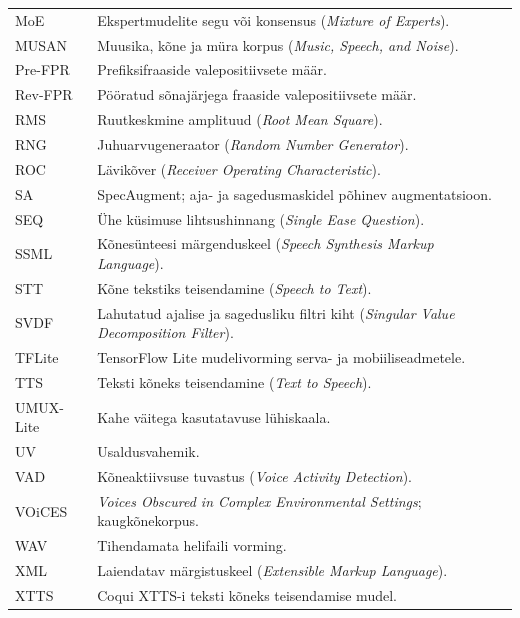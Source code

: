 \begin{longtable}{p{3.2cm}p{9.8cm}}
MoE & Ekspertmudelite segu või konsensus (\textit{Mixture of Experts}).\\
MUSAN & Muusika, kõne ja müra korpus (\textit{Music, Speech, and Noise}).\\
Pre-FPR & Prefiksifraaside valepositiivsete määr.\\
Rev-FPR & Pööratud sõnajärjega fraaside valepositiivsete määr.\\
RMS & Ruutkeskmine amplituud (\textit{Root Mean Square}).\\
RNG & Juhuarvugeneraator (\textit{Random Number Generator}).\\
ROC & Lävikõver (\textit{Receiver Operating Characteristic}).\\
SA & SpecAugment; aja- ja sagedusmaskidel põhinev augmentatsioon.\\
SEQ & Ühe küsimuse lihtsushinnang (\textit{Single Ease Question}).\\
SSML & Kõnesünteesi märgenduskeel (\textit{Speech Synthesis Markup Language}).\\
STT & Kõne tekstiks teisendamine (\textit{Speech to Text}).\\
SVDF & Lahutatud ajalise ja sagedusliku filtri kiht (\textit{Singular Value Decomposition Filter}).\\
TFLite & TensorFlow Lite mudelivorming serva- ja mobiiliseadmetele.\\
TTS & Teksti kõneks teisendamine (\textit{Text to Speech}).\\
UMUX-Lite & Kahe väitega kasutatavuse lühiskaala.\\
UV & Usaldusvahemik.\\
VAD & Kõneaktiivsuse tuvastus (\textit{Voice Activity Detection}).\\
VOiCES & \textit{Voices Obscured in Complex Environmental Settings}; kaugkõnekorpus.\\
WAV & Tihendamata helifaili vorming.\\
XML & Laiendatav märgistuskeel (\textit{Extensible Markup Language}).\\
XTTS & Coqui XTTS-i teksti kõneks teisendamise mudel.\\
\end{longtable}
\addtocounter{table}{-1}
